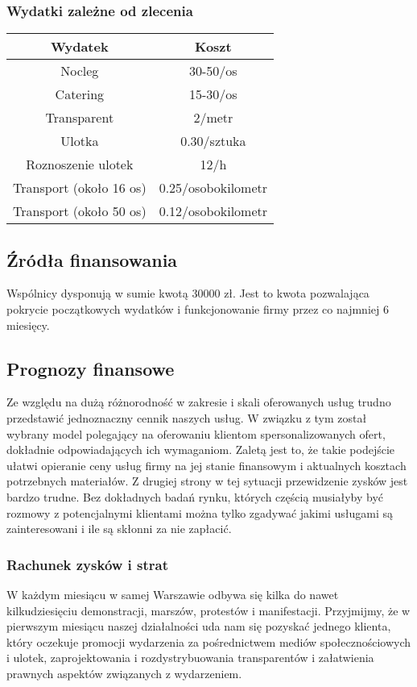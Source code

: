 \documentclass{article}
\begin{document}
\subsubsection{Wydatki zależne od zlecenia}
\begin{table}[H]
\label{table2}
\vspace{0.3cm}
\hspace{-2cm}
\centering
\begin{tabular}{|c|c|}
\hline
Wydatek & Koszt \\
\hline
Nocleg & 30-50/os \\
Catering & 15-30/os \\
Transparent & 2/metr \\
Ulotka & 0.30/sztuka \\
Roznoszenie ulotek & 12/h \\
Transport (około 16 os) & 0.25/osobokilometr \\
Transport (około 50 os) & 0.12/osobokilometr \\
\hline
\end{tabular}
\end{table}

\subsection{Źródła finansowania}
Wspólnicy dysponują w sumie kwotą 30000 zł. Jest to kwota pozwalająca pokrycie początkowych wydatków i funkcjonowanie firmy przez co najmniej 6 miesięcy.

\subsection{Prognozy finansowe}
Ze względu na dużą różnorodność w zakresie i skali oferowanych usług trudno przedstawić jednoznaczny cennik naszych usług. W związku z tym został wybrany model polegający na oferowaniu klientom spersonalizowanych ofert, dokładnie odpowiadających ich wymaganiom. Zaletą jest to, że takie podejście ułatwi opieranie ceny usług firmy na jej stanie finansowym i aktualnych kosztach potrzebnych materiałów. Z drugiej strony w tej sytuacji przewidzenie zysków jest bardzo trudne. Bez dokładnych badań rynku, których częścią musiałyby być rozmowy z potencjalnymi klientami można tylko zgadywać jakimi usługami są zainteresowani i ile są skłonni za nie zapłacić.

\subsubsection{Rachunek zysków i strat}
W każdym miesiącu w samej Warszawie odbywa się kilka do nawet kilkudziesięciu demonstracji, marszów, protestów i manifestacji. Przyjmijmy, że w pierwszym miesiącu naszej działalności uda nam się pozyskać jednego klienta, który oczekuje promocji wydarzenia za pośrednictwem mediów społecznościowych i ulotek, zaprojektowania i rozdystrybuowania transparentów i załatwienia prawnych aspektów związanych z wydarzeniem.
\end{document}
